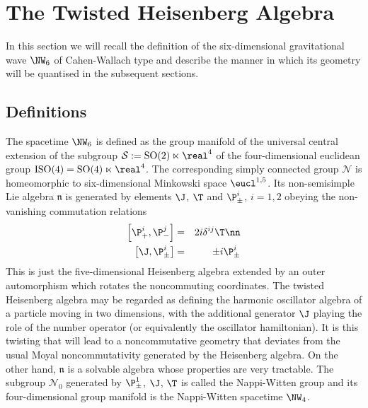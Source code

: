 \section{The Twisted Heisenberg Algebra}
\label{TTHA}
In this section we will recall the definition of the six-dimensional
gravitational wave $\NW_6$ of Cahen-Wallach type and describe the manner in
which its geometry will be quantised in the subsequent sections.

\subsection{Definitions}
\label{Defs}
The spacetime $\NW_6$ is defined as the group manifold of the universal central
extension of the subgroup $\mathcal{S}:={\rm SO}(2)\ltimes\real^4$ of the
four-dimensional euclidean group ${\rm ISO}(4)={\rm SO}(4)\ltimes\real^4$. The
corresponding simply connected group $\mathcal N$ is homeomorphic to
six-dimensional Minkowski space $\eucl^{1,5}$. Its non-semisimple Lie algebra
$\mathfrak n$ is generated by elements $\J$, $\T$ and $\P^i_\pm$, $i=1,2$
obeying the non-vanishing commutation relations
\begin{eqnarray}
  \label{NW4algdef}
  \left[\P^i_+ , \P^j_-\right]&=&2 i \delta^{ij} \T   \nn\\
  \left[\J , \P^i_\pm\right]&=&\pm i \P^i_\pm
\end{eqnarray}
This is just the five-dimensional Heisenberg algebra extended by an outer
automorphism which rotates the noncommuting coordinates. The twisted Heisenberg
algebra may be regarded as defining the harmonic oscillator algebra of a
particle moving in two dimensions, with the additional generator $\J$ playing
the role of the number operator (or equivalently the oscillator hamiltonian). It
is this twisting that will lead to a noncommutative geometry that deviates from
the usual Moyal noncommutativity generated by the Heisenberg algebra. On the
other hand, $\mathfrak{n}$ is a solvable algebra whose properties are very
tractable. The subgroup $\mathcal{N}_0$ generated by $\P^1_\pm$, $\J$, $\T$ is
called the Nappi-Witten group and its four-dimensional group manifold is the
Nappi-Witten spacetime $\NW_4$.

